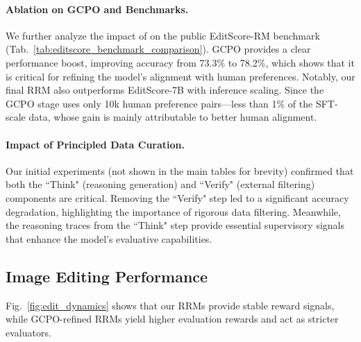 \paragraph{Ablation on GCPO and Benchmarks.} 
We further analyze the impact of \gcpo{} on the public EditScore-RM benchmark (Tab.~\ref{tab:editscore_benchmark_comparison}). GCPO provides a clear performance boost, improving accuracy from 73.3\% to 78.2\%, which shows that it is critical for refining the model's alignment with human preferences. Notably, our final RRM also outperforms EditScore-7B with inference scaling. Since the GCPO stage uses only 10k human preference pairs---less than 1\% of the SFT-scale data, whose gain is mainly attributable to better human alignment.
\paragraph{Impact of Principled Data Curation.}
Our initial experiments (not shown in the main tables for brevity) confirmed that both the ``Think" (reasoning generation) and ``Verify" (external filtering) components are critical. Removing the ``Verify" step led to a significant accuracy degradation, highlighting the importance of rigorous data filtering. Meanwhile, the reasoning traces from the ``Think" step provide essential supervisory signals that enhance the model's evaluative capabilities.
\subsection{Image Editing Performance}
Fig.~\ref{fig:edit_dynamics} shows that our RRMs provide stable reward signals, while GCPO-refined RRMs yield higher evaluation rewards and act as stricter evaluators.
\vspace{-.5em}
